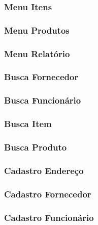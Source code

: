 \subsubsection{Menu Itens}

\subsubsection{Menu Produtos}

\subsubsection{Menu Relatório}

\subsubsection{Busca Fornecedor}

\subsubsection{Busca Funcionário}

\subsubsection{Busca Item}

\subsubsection{Busca Produto}

\subsubsection{Cadastro Endereço}

\subsubsection{Cadastro Fornecedor}

\subsubsection{Cadastro Funcionário}


